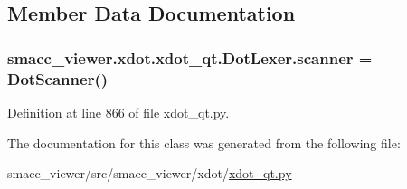 \subsection{Member Data Documentation}
\subsubsection[{\texorpdfstring{scanner}{scanner}}]{\setlength{\rightskip}{0pt plus 5cm}smacc\+\_\+viewer.\+xdot.\+xdot\+\_\+qt.\+Dot\+Lexer.\+scanner = {\bf Dot\+Scanner}()\hspace{0.3cm}{\ttfamily [static]}}\hypertarget{classsmacc__viewer_1_1xdot_1_1xdot__qt_1_1DotLexer_a9f5cee5823d09d8eb8a00e326160b0e4}{}\label{classsmacc__viewer_1_1xdot_1_1xdot__qt_1_1DotLexer_a9f5cee5823d09d8eb8a00e326160b0e4}


Definition at line 866 of file xdot\+\_\+qt.\+py.



The documentation for this class was generated from the following file\+:\begin{DoxyCompactItemize}
\item 
smacc\+\_\+viewer/src/smacc\+\_\+viewer/xdot/\hyperlink{xdot__qt_8py}{xdot\+\_\+qt.\+py}\end{DoxyCompactItemize}
